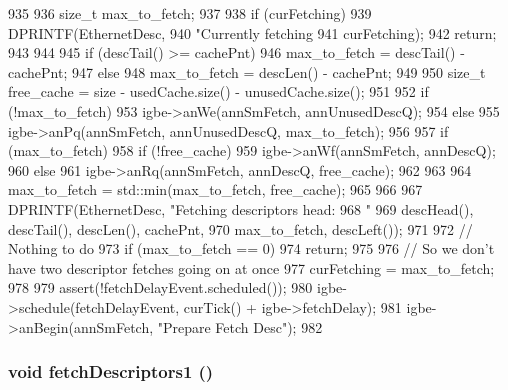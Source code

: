 \begin{DoxyCode}
935 {
936     size_t max_to_fetch;
937 
938     if (curFetching) {
939         DPRINTF(EthernetDesc,
940                 "Currently fetching %
941                 curFetching);
942         return;
943     }
944 
945     if (descTail() >= cachePnt)
946         max_to_fetch = descTail() - cachePnt;
947     else
948         max_to_fetch = descLen() - cachePnt;
949 
950     size_t free_cache = size - usedCache.size() - unusedCache.size();
951 
952     if (!max_to_fetch)
953         igbe->anWe(annSmFetch, annUnusedDescQ);
954     else
955         igbe->anPq(annSmFetch, annUnusedDescQ, max_to_fetch);
956 
957     if (max_to_fetch) {
958         if (!free_cache)
959             igbe->anWf(annSmFetch, annDescQ);
960         else
961             igbe->anRq(annSmFetch, annDescQ, free_cache);
962     }
963 
964     max_to_fetch = std::min(max_to_fetch, free_cache);
965             
966 
967     DPRINTF(EthernetDesc, "Fetching descriptors head: %
968             "%
969             descHead(), descTail(), descLen(), cachePnt,
970             max_to_fetch, descLeft());
971 
972     // Nothing to do
973     if (max_to_fetch == 0)
974         return;
975             
976     // So we don't have two descriptor fetches going on at once
977     curFetching = max_to_fetch;
978 
979     assert(!fetchDelayEvent.scheduled());
980     igbe->schedule(fetchDelayEvent, curTick() + igbe->fetchDelay);
981     igbe->anBegin(annSmFetch, "Prepare Fetch Desc");
982 }
\end{DoxyCode}
\hypertarget{classIGbE_1_1DescCache_a2fbe1c3d2d7e697512e63f3d14787e8b}{
\subsubsection[{fetchDescriptors1}]{\setlength{\rightskip}{0pt plus 5cm}void fetchDescriptors1 ()}}
\label{classIGbE_1_1DescCache_a2fbe1c3d2d7e697512e63f3d14787e8b}




